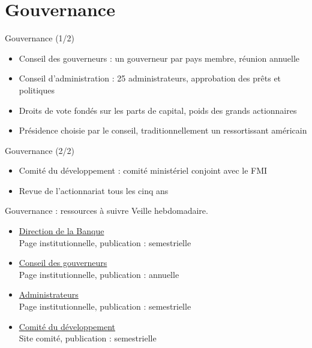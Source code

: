 \documentclass[aspectratio=169,11pt]{beamer}
\begin{document}
\section{Gouvernance}
\begin{frame}{Gouvernance (1/2)}
\begin{itemize}
\item Conseil des gouverneurs : un gouverneur par pays membre, réunion annuelle
\item Conseil d'administration : 25 administrateurs, approbation des prêts et politiques
\item Droits de vote fondés sur les parts de capital, poids des grands actionnaires
\item Présidence choisie par le conseil, traditionnellement un ressortissant américain
\end{itemize}
\end{frame}

\begin{frame}{Gouvernance (2/2)}
\begin{itemize}
\item Comité du développement : comité ministériel conjoint avec le FMI
\item Revue de l'actionnariat tous les cinq ans
\end{itemize}
\end{frame}

\begin{frame}{Gouvernance : ressources à suivre}
\small
Veille hebdomadaire.
\begin{itemize}
\item \href{https://www.worldbank.org/en/about/leadership}{Direction de la Banque}\\{\footnotesize Page institutionnelle, publication : semestrielle}
\item \href{https://www.worldbank.org/en/about/leadership/governors}{Conseil des gouverneurs}\\{\footnotesize Page institutionnelle, publication : annuelle}
\item \href{https://www.worldbank.org/en/about/leadership/directors}{Administrateurs}\\{\footnotesize Page institutionnelle, publication : semestrielle}
\item \href{https://www.devcommittee.org}{Comité du développement}\\{\footnotesize Site comité, publication : semestrielle}
\end{itemize}
\end{frame}
\end{document}
